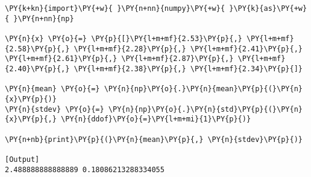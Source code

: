 \begin{Verbatim}[label=\makebox{\href{https://github.com/unipi-physics-labs/statnotes/tree/main/snippy/sample_stat_numpy.py}{https://github.com/.../sample\_stat\_numpy.py}},commandchars=\\\{\}]
\PY{k+kn}{import}\PY{+w}{ }\PY{n+nn}{numpy}\PY{+w}{ }\PY{k}{as}\PY{+w}{ }\PY{n+nn}{np}

\PY{n}{x} \PY{o}{=} \PY{p}{[}\PY{l+m+mf}{2.53}\PY{p}{,} \PY{l+m+mf}{2.58}\PY{p}{,} \PY{l+m+mf}{2.28}\PY{p}{,} \PY{l+m+mf}{2.41}\PY{p}{,} \PY{l+m+mf}{2.61}\PY{p}{,} \PY{l+m+mf}{2.87}\PY{p}{,} \PY{l+m+mf}{2.40}\PY{p}{,} \PY{l+m+mf}{2.38}\PY{p}{,} \PY{l+m+mf}{2.34}\PY{p}{]}

\PY{n}{mean} \PY{o}{=} \PY{n}{np}\PY{o}{.}\PY{n}{mean}\PY{p}{(}\PY{n}{x}\PY{p}{)}
\PY{n}{stdev} \PY{o}{=} \PY{n}{np}\PY{o}{.}\PY{n}{std}\PY{p}{(}\PY{n}{x}\PY{p}{,} \PY{n}{ddof}\PY{o}{=}\PY{l+m+mi}{1}\PY{p}{)}

\PY{n+nb}{print}\PY{p}{(}\PY{n}{mean}\PY{p}{,} \PY{n}{stdev}\PY{p}{)}

[Output]
2.488888888888889 0.18086213288334055
\end{Verbatim}
